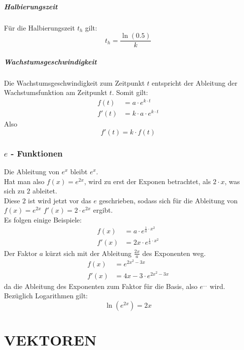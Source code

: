 \documentclass[a4paper,12pt]{article}
\begin{document}
\subsubsection{Halbierungszeit}
Für die Halbierungszeit $t_h$ gilt:
$$t_h = \frac{\ln{(0.5)}}{k}$$
\subsubsection{Wachstumsgeschwindigkeit}
Die Wachstumsgeschwindigkeit zum Zeitpunkt $t$ entspricht der Ableitung der Wachstumsfunktion am Zeitpunkt $t$.
Somit gilt:
\begin{equation}
\begin{split}
f(t) & = a \cdot e^{k \cdot t}\\
f'(t) &= k \cdot a \cdot e^{k \cdot t}
\end{split}
\end{equation}
Also $$f'(t) = k \cdot f(t)$$
\section{$e$ - Funktionen}
Die Ableitung von $e^x$ bleibt $e^x$.\\
Hat man also $f(x) = e^{2x}$, wird zu erst der Exponen betrachtet, als $2 \cdot x$, was sich zu $2$ ableitet.\\
Diese $2$ ist wird jetzt vor das $e$ geschrieben, sodass sich für die Ableitung von $f(x) = e^{2x}$ $f'(x) = 2 \cdot e^{2x}$ ergibt.\\
Es folgen einige Beispiele:\\
\begin{equation}
\begin{split}
f(x) & = a \cdot e^{\frac{1}{a} \cdot x^2}\\
f'(x) & = 2x \cdot e^{\frac{1}{a} \cdot x^2}
\end{split}
\end{equation}
Der Faktor $a$ kürzt sich mit der Ableitung $\frac{2x}{a}$ des Exponenten weg.
\begin{equation}
\begin{split}
f(x) & = e^{2x^2-3x}\\
f'(x) & = 4x - 3 \cdot e^{2x^2-3x}
\end{split}
\end{equation}
da die Ableitung des Exponenten zum Faktor für die Basis, also $e^{...}$ wird.\\
Bezüglich Logarithmen gilt:$$\ln{(e^{2x})} = 2x$$
\pagebreak
\part{VEKTOREN}
\end{document}
